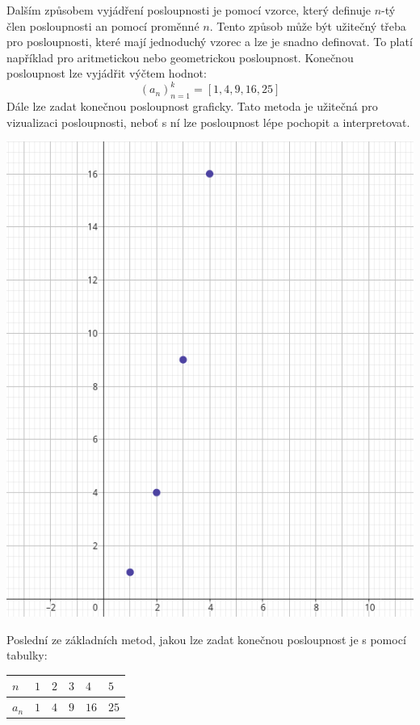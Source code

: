 \documentclass[12pt]{report}			%
\begin{document}
Dalším způsobem vyjádření posloupnosti je pomocí vzorce, který definuje $n$-tý člen posloupnosti an pomocí proměnné $n$. Tento způsob může být užitečný třeba pro posloupnosti, které mají jednoduchý vzorec a lze je snadno definovat. To platí například pro aritmetickou nebo geometrickou posloupnost. 
Konečnou posloupnost lze vyjádřit výčtem hodnot:
\[(a_n)_{n=1}^k=[1, 4, 9, 16, 25]\]  
\newpage
Dále lze zadat konečnou posloupnost graficky. Tato metoda je užitečná pro vizualizaci posloupnosti, neboť s ní lze posloupnost lépe pochopit a interpretovat.
\begin{center}
\includegraphics[scale=0.4]{./images/graf_posloupnosti.png}

\end{center}
Poslední ze základních metod, jakou lze zadat konečnou posloupnost je s pomocí tabulky:


\begin{center}
\begin{tabular}{ | m{1cm} | m{1cm}| m{1cm} | m{1cm} |m{1cm} |m{1cm} |} 
\hline
  $n$ & $1$ & $2$ & $3$ & $4$ & $5$ \\
\hline
	$a_n$ & $1$ & $4$ & $9$ & $16$ & $25$ \\
\hline
\end{tabular}
\end{center}
\end{document}
